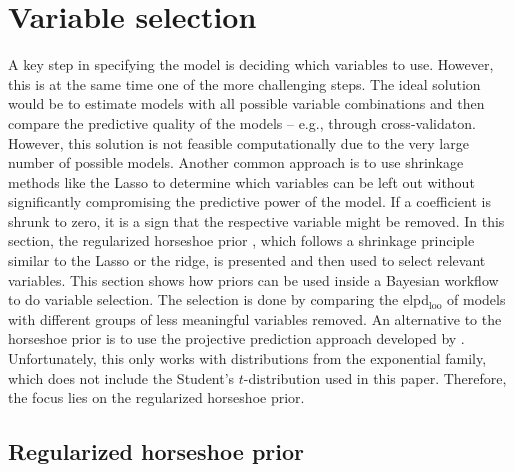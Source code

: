 \section{Variable selection}
\label{ch:varsel}
A key step in specifying the model is deciding which variables to use.
However, this is at the same time one of the more challenging steps.
The ideal solution would be to estimate models with all possible variable combinations and then compare the predictive quality of the models – e.g., through cross-validaton.
However, this solution is not feasible computationally due to the very large number of possible models.
Another common approach is to use shrinkage methods like the Lasso \citep{tibshirani_regression_1996} to determine which variables can be left out without significantly compromising the predictive power of the model.
If a coefficient is shrunk to zero, it is a sign that the respective variable might be removed.
In this section, the regularized horseshoe prior \citep{piironen_sparsity_2017}, which follows a shrinkage principle similar to the Lasso or the ridge, is presented and then used to select relevant variables.
This section shows how priors can be used inside a Bayesian workflow to do variable selection.
The selection is done by comparing the elpd$_{\text{loo}}$ of models with different groups of less meaningful variables removed. An alternative to the horseshoe prior is to use the projective prediction approach developed by \cite{piironen_projective_2020}.
Unfortunately, this only works with distributions from the exponential family, which does not include the Student's $t$-distribution used in this paper.
Therefore, the focus lies on the regularized horseshoe prior.

\subsection{Regularized horseshoe prior}

